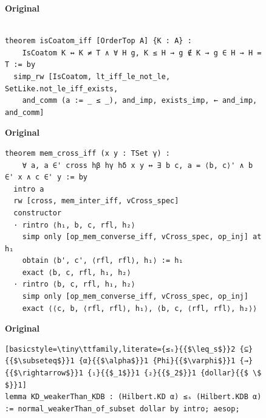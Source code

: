 \begin{figure}[tbp]
\begin{minipage}[t]{0.33\textwidth}
\textbf{Original}
\begin{lstlisting}[basicstyle=\tiny\ttfamily]

theorem isCoatom_iff [OrderTop A] {K : A} :
    IsCoatom K ↔ K ≠ T ∧ ∀ H g, K ≤ H → g ∉ K → g ∈ H → H = T := by
  simp_rw [IsCoatom, lt_iff_le_not_le, SetLike.not_le_iff_exists,
    and_comm (a := _ ≤ _), and_imp, exists_imp, ← and_imp, and_comm]
\end{lstlisting}

\end{minipage}\begin{minipage}[t]{0.33\textwidth}
\textbf{Original}
\begin{lstlisting}[basicstyle=\tiny\ttfamily]
theorem mem_cross_iff (x y : TSet γ) :
    ∀ a, a ∈' cross hβ hγ hδ x y ↔ ∃ b c, a = ⟨b, c⟩' ∧ b ∈' x ∧ c ∈' y := by
  intro a
  rw [cross, mem_inter_iff, vCross_spec]
  constructor
  · rintro ⟨h₁, b, c, rfl, h₂⟩
    simp only [op_mem_converse_iff, vCross_spec, op_inj] at h₁
    obtain ⟨b', c', ⟨rfl, rfl⟩, h₁⟩ := h₁
    exact ⟨b, c, rfl, h₁, h₂⟩
  · rintro ⟨b, c, rfl, h₁, h₂⟩
    simp only [op_mem_converse_iff, vCross_spec, op_inj]
    exact ⟨⟨c, b, ⟨rfl, rfl⟩, h₁⟩, ⟨b, c, ⟨rfl, rfl⟩, h₂⟩⟩
\end{lstlisting}
\end{minipage}\begin{minipage}[t]{0.33\textwidth}
\textbf{Original}
\begin{lstlisting}[basicstyle=\tiny\ttfamily,literate={≤ₛ}{{$\leq_s$}}2 {⊆}{{$\subseteq$}}1 {α}{{$\alpha$}}1 {Phi}{{$\varphi$}}1 {→}{{$\rightarrow$}}1 {₁}{{$_1$}}1 {₂}{{$_2$}}1 {dollar}{{$ \$ $}}1]
lemma KD_weakerThan_KDB : (Hilbert.KD α) ≤ₛ (Hilbert.KDB α) := normal_weakerThan_of_subset dollar by intro; aesop;
\end{lstlisting}
\end{minipage}


\end{figure}
